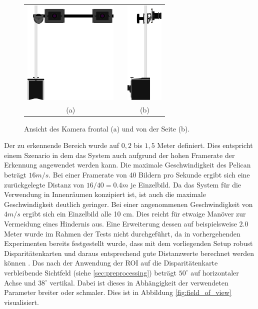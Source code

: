 \begin{figure}[h]
	\centering
	\begin{tabular}{ccc}
		\includegraphics[height=5cm]{img/camera_setup_front} & 
		\quad \quad \quad \quad \quad \quad \quad & 
		\includegraphics[height=5cm]{img/camera_setup_side} \\
		(a) & & (b)
	\end{tabular}
	\caption{Ansicht des Kamera frontal (a) und von der Seite (b).}
	\label{fig:setup}
\end{figure}

\noindent
Der zu erkennende Bereich wurde auf $0,2$ bis $1,5$ Meter definiert. Dies entspricht einem Szenario in dem das System auch aufgrund der hohen Framerate der Erkennung angewendet werden kann. Die maximale Geschwindigkeit des Pelican beträgt $16 m/s$. Bei einer Framerate von 40 Bildern pro Sekunde ergibt sich eine zurückgelegte Distanz von $16/40=0.4 m$ je Einzelbild. Da das System für die Verwendung in Innenräumen konzipiert ist, ist auch die maximale Geschwindigkeit deutlich geringer. Bei einer angenommenen Geschwindigkeit von $4 m/s$ ergibt sich ein Einzelbild alle 10 cm. Dies reicht für etwaige Manöver zur Vermeidung eines Hindernis aus. Eine Erweiterung dessen auf beispielsweise $2.0$ Meter wurde im Rahmen der Tests nicht durchgeführt, da in vorhergehenden Experimenten bereits festgestellt wurde, dass mit dem vorliegenden Setup robust Disparitätenkarten und daraus entsprechend gute Distanzwerte berechnet werden können \cite{hilleralhallak}. Das nach der Anwendung der ROI auf die Disparitätenkarte verbleibende Sichtfeld (siehe \ref{sec:preprocessing}) beträgt $50^{\circ}$ auf horizontaler Achse und $38^{\circ}$ vertikal. Dabei ist dieses in Abhängigkeit der verwendeten Parameter breiter oder schmaler. Dies ist in Abbildung \ref{fig:field_of_view} visualisiert.
	

